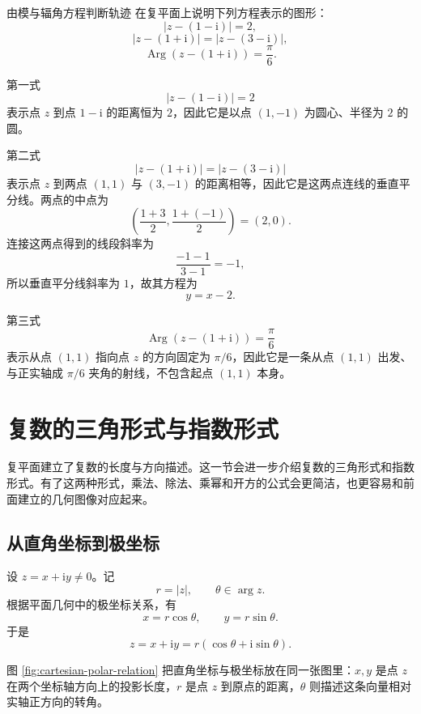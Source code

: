 \begin{lizi}{由模与辐角方程判断轨迹}{}
在复平面上说明下列方程表示的图形：
\[
|z-(1-\mathrm{i})|=2,
\]
\[
|z-(1+\mathrm{i})|=|z-(3-\mathrm{i})|,
\]
\[
\operatorname{Arg}(z-(1+\mathrm{i}))=\frac{\pi}{6}.
\]

\begin{jie}
第一式
\[
|z-(1-\mathrm{i})|=2
\]
表示点 $z$ 到点 $1-\mathrm{i}$ 的距离恒为 $2$，因此它是以点 $(1,-1)$ 为圆心、半径为 $2$ 的圆。

第二式
\[
|z-(1+\mathrm{i})|=|z-(3-\mathrm{i})|
\]
表示点 $z$ 到两点 $(1,1)$ 与 $(3,-1)$ 的距离相等，因此它是这两点连线的垂直平分线。两点的中点为
\[
\left(\frac{1+3}{2},\frac{1+(-1)}{2}\right)=(2,0).
\]
连接这两点得到的线段斜率为
\[
\frac{-1-1}{3-1}=-1,
\]
所以垂直平分线斜率为 $1$，故其方程为
\[
y=x-2.
\]

第三式
\[
\operatorname{Arg}(z-(1+\mathrm{i}))=\frac{\pi}{6}
\]
表示从点 $(1,1)$ 指向点 $z$ 的方向固定为 $\pi/6$，因此它是一条从点 $(1,1)$ 出发、与正实轴成 $\pi/6$ 夹角的射线，不包含起点 $(1,1)$ 本身。
\end{jie}
\end{lizi}

\section{复数的三角形式与指数形式}

\begin{wulibj}[为什么要换一种表示法]
复平面建立了复数的长度与方向描述。这一节会进一步介绍复数的三角形式和指数形式。有了这两种形式，乘法、除法、乘幂和开方的公式会更简洁，也更容易和前面建立的几何图像对应起来。
\end{wulibj}

\subsection{从直角坐标到极坐标}

设 $z=x+\mathrm{i}y\neq 0$。记
\[
r=|z|,\qquad \theta\in \arg z.
\]
根据平面几何中的极坐标关系，有
\begin{equation}
    x=r\cos\theta,\qquad y=r\sin\theta.
\end{equation}
于是
\begin{equation}
    z=x+\mathrm{i}y=r(\cos\theta+\mathrm{i}\sin\theta).
\end{equation}

图 \ref{fig:cartesian-polar-relation} 把直角坐标与极坐标放在同一张图里：$x,y$ 是点 $z$ 在两个坐标轴方向上的投影长度，$r$ 是点 $z$ 到原点的距离，$\theta$ 则描述这条向量相对实轴正方向的转角。

